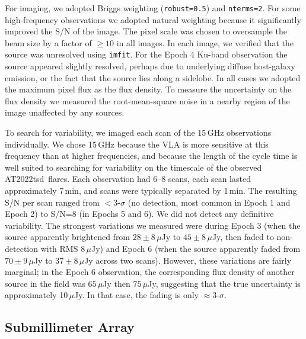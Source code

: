 \documentclass{nature_plusfigure}
\newcommand{\at}{AT2022tsd}
\begin{document}
\begin{methods}
For imaging, we adopted Briggs weighting (\texttt{robust=0.5}) and \texttt{nterms=2}. For some high-frequency observations we adopted natural weighting because it significantly improved the S/N of the image.
The pixel scale was chosen to oversample the beam size by a factor of $\geq10$ in all images.
In each image, we verified that the source was unresolved using \texttt{imfit}.
For the Epoch 4 Ku-band observation the source appeared slightly resolved, perhaps due to underlying diffuse host-galaxy emission, or the fact that the source lies along a sidelobe.
In all cases we adopted the maximum pixel flux as the flux density.
To measure the uncertainty on the flux density we measured the root-mean-square noise in a nearby region of the image unaffected by any sources.

To search for variability, we imaged each scan of the 15\,GHz observations individually. We chose 15\,GHz because the VLA is more sensitive at this frequency than at higher frequencies, and because the length of the cycle time is well suited to searching for variability on the timescale of the observed \at\ flares. Each observation had 6--8 scans, each scan lasted approximately 7\,min, and scans were typically separated by 1\,min. The resulting S/N per scan ranged from $<3$-$\sigma$ (no detection, most common in Epoch 1 and Epoch 2) to S/N=8 (in Epochs 5 and 6).
We did not detect any definitive variability. The strongest variations we measured were during Epoch 3 (when the source apparently brightened from $28\pm8\,\mu$Jy to $45\pm8\,\mu$Jy, then faded to non-detection with RMS $8\,\mu$Jy) and Epoch 6 (when the source apparently faded from $70\pm9\,\mu$Jy to $37\pm8\,\mu$Jy across two scans). However, these variations are fairly marginal; in the Epoch 6 observation, the corresponding flux density of another source in the field was $65\,\mu$Jy then $75\,\mu$Jy, suggesting that the true uncertainty is approximately 10$\,\mu$Jy. In that case, the fading is only $\approx3$-$\sigma$.


\subsection{Submillimeter Array}
\label{Methods:SMA}


\end{methods}
\end{document}
